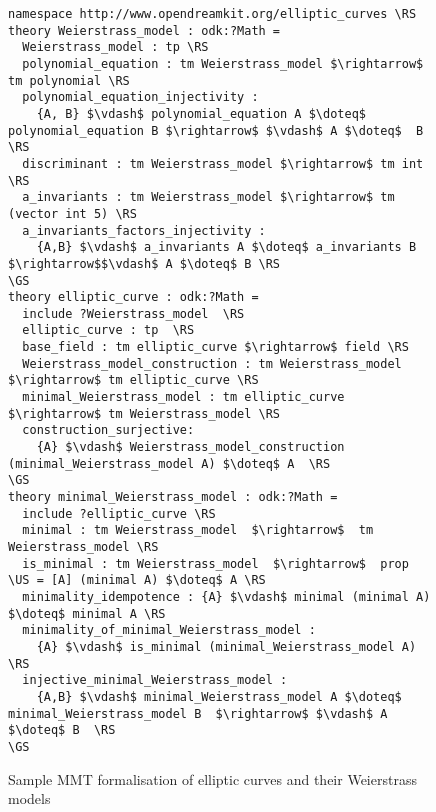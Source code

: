 \begin{figure}[ht]
\begin{lstlisting}[morekeywords={namespace,theory,include},mathescape]
namespace http://www.opendreamkit.org/elliptic_curves \RS
theory Weierstrass_model : odk:?Math = 
  Weierstrass_model : tp \RS
  polynomial_equation : tm Weierstrass_model $\rightarrow$ tm polynomial \RS
  polynomial_equation_injectivity : 
    {A, B} $\vdash$ polynomial_equation A $\doteq$  polynomial_equation B $\rightarrow$ $\vdash$ A $\doteq$  B \RS
  discriminant : tm Weierstrass_model $\rightarrow$ tm int \RS
  a_invariants : tm Weierstrass_model $\rightarrow$ tm (vector int 5) \RS
  a_invariants_factors_injectivity : 
    {A,B} $\vdash$ a_invariants A $\doteq$ a_invariants B $\rightarrow$$\vdash$ A $\doteq$ B \RS
\GS
theory elliptic_curve : odk:?Math = 
  include ?Weierstrass_model  \RS
  elliptic_curve : tp  \RS
  base_field : tm elliptic_curve $\rightarrow$ field \RS
  Weierstrass_model_construction : tm Weierstrass_model $\rightarrow$ tm elliptic_curve \RS
  minimal_Weierstrass_model : tm elliptic_curve $\rightarrow$ tm Weierstrass_model \RS
  construction_surjective: 
    {A} $\vdash$ Weierstrass_model_construction (minimal_Weierstrass_model A) $\doteq$ A  \RS
\GS
theory minimal_Weierstrass_model : odk:?Math =
  include ?elliptic_curve \RS
  minimal : tm Weierstrass_model  $\rightarrow$  tm Weierstrass_model \RS
  is_minimal : tm Weierstrass_model  $\rightarrow$  prop \US = [A] (minimal A) $\doteq$ A \RS
  minimality_idempotence : {A} $\vdash$ minimal (minimal A) $\doteq$ minimal A \RS
  minimality_of_minimal_Weierstrass_model : 
    {A} $\vdash$ is_minimal (minimal_Weierstrass_model A)  \RS
  injective_minimal_Weierstrass_model : 
    {A,B} $\vdash$ minimal_Weierstrass_model A $\doteq$ minimal_Weierstrass_model B  $\rightarrow$ $\vdash$ A $\doteq$ B  \RS
\GS
\end{lstlisting}
\caption{Sample MMT formalisation of elliptic curves and their Weierstrass models}\label{mmt-ec}
\end{figure}


